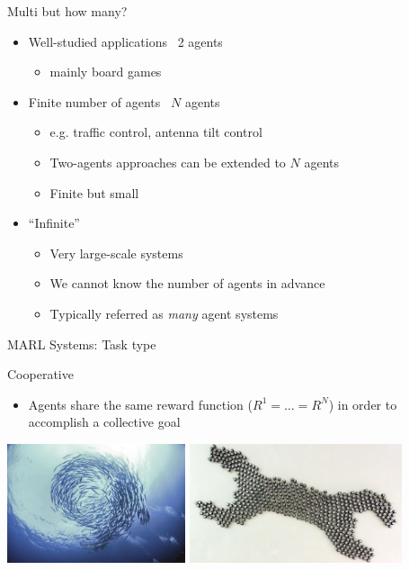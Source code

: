 \documentclass[presentation, 8pt]{beamer}\mode<presentation>{\usetheme{AMSBolognaFC}}
\begin{document}
\begin{frame}{Multi but how many?}
	\begin{itemize}
		\item Well-studied applications \faArrowRight \, 2 agents
		\begin{itemize}
			\item mainly board games
		\end{itemize}
		\item Finite number of agents \faArrowRight \, $N$ agents
		\begin{itemize}
			\item e.g. traffic control, antenna tilt control
			\item Two-agents approaches can be extended to $N$ agents
			\item Finite but small
		\end{itemize}
		\item ``Infinite''
		\begin{itemize}
			\item Very large-scale systems
			\item We cannot know the number of agents in advance
			\item Typically referred as \emph{many} agent systems
		\end{itemize}
	\end{itemize}
\end{frame}

\begin{frame}{MARL Systems: Task type}
		\begin{alertblock}{Cooperative}
			\begin{itemize}
				\item Agents share the same reward function ($R^1 = \dots = R^N$) in order to accomplish a collective goal
			\end{itemize}
		\end{alertblock}
		\centering
		\includegraphics[height=3.5cm]{img/cooperative.jpg}
		\includegraphics[height=3.5cm]{img/cas-1.jpg}
		
	\end{frame}
	
\end{document}
